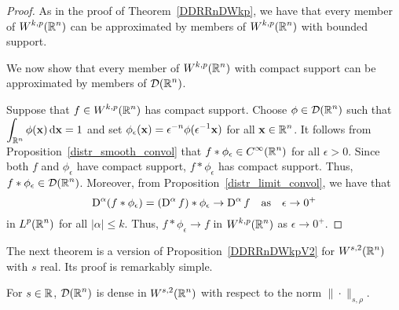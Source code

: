 \begin{proof}
As in the proof of Theorem~\ref{DDRRnDWkp}, we have that every member of
$\displaystyle W^{k,p}(\mathbb{R}^n)$ can be approximated by members of
$\displaystyle W^{k,p}(\mathbb{R}^n)$ with bounded support.

We now show that every member of $\displaystyle W^{k,p}(\mathbb{R}^n)$ with
compact support can be approximated by members of $\displaystyle \mathcal{D}(\mathbb{R}^n)$.

Suppose that $\displaystyle f \in W^{k,p}(\mathbb{R}^n)$ has compact
support.  Choose $\displaystyle \phi \in \mathcal{D}(\mathbb{R}^n)$ such that\\
$\displaystyle \int_{\mathbb{R}^n} \phi(\mathbf{x}) \,\mathrm{d}{\mathbf{x}} = 1$
and set
$\displaystyle \phi_\epsilon(\mathbf{x}) = \epsilon^{-n}\phi(\epsilon^{-1} \mathbf{x})$
for all $\displaystyle \mathbf{x} \in \mathbb{R}^n$.
It follows from Proposition~\ref{distr_smooth_convol} that
$\displaystyle f \ast \phi_{\epsilon} \in C^\infty(\mathbb{R}^n)$ for all $\epsilon>0$.
Since both $f$ and $\phi_\epsilon$ have compact support, 
$f \ast \phi_{\epsilon}$ has compact support.  Thus,
$\displaystyle f \ast \phi_{\epsilon} \in \mathcal{D}(\mathbb{R}^n)$.  Moreover, from 
Proposition~\ref{distr_limit_convol}, we have that
\[
  \operatorname{D}^{\alpha} (f \ast \phi_\epsilon)
  = (\operatorname{D}^\alpha f) \ast \phi_\epsilon \to \operatorname{D}^\alpha f
\quad \text{as} \quad \epsilon \to 0^+
\]
in $\displaystyle L^p(\mathbb{R}^n)$ for all $|\alpha| \leq k$.  Thus,
$f \ast \phi_{\epsilon} \to f$ in $\displaystyle W^{k,p}(\mathbb{R}^n)$ as
$\epsilon \to 0^+$.
\end{proof}

The next theorem is a version of Proposition~\ref{DDRRnDWkpV2} for
$\displaystyle W^{s,2}(\mathbb{R}^n)$ with $s$ real.  Its proof is remarkably simple.

\begin{theorem} \label{DDRRnDWs2}
For $s\in \mathbb{R}$, $\displaystyle \mathcal{D}(\mathbb{R}^n)$ is dense in
$\displaystyle W^{s,2}(\mathbb{R}^n)$ with
respect to the norm $\|\cdot\|_{s,\rho}$.
\end{theorem}

